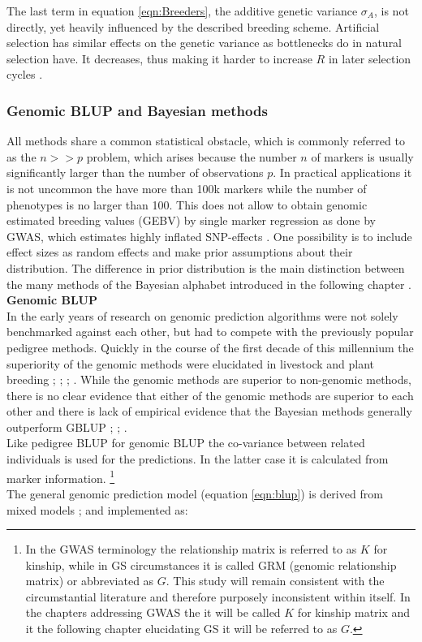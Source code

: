 The last term in equation \ref{eqn:Breeders}, the additive genetic variance $\sigma_A$, is
not directly, yet heavily influenced by the described breeding scheme. Artificial
selection has similar effects on the genetic variance as bottlenecks do in natural selection
have. It decreases, thus making it harder to increase $R$ in later selection cycles
\cite{walsh2018}.

\subsubsection{Genomic BLUP and Bayesian methods}\label{blup:bayes}

All methods share a common statistical obstacle, which is commonly referred to as the
$n >> p$ problem, which arises because the number $n$ of markers is usually significantly
larger than the number of observations $p$. In practical applications it is not uncommon
the have more than 100k markers while the number of phenotypes is no larger than 100. This
does not allow to obtain genomic estimated breeding values (GEBV) by single marker
regression as done by GWAS, which estimates highly inflated SNP-effects
\cite{korte2013advantages}. One possibility is to include effect sizes as random effects
and make prior assumptions about their distribution. The difference in prior distribution
is the main distinction between the many methods of the Bayesian alphabet introduced in
the following chapter \cite{gianola2013}.\\

\noindent
\textbf{Genomic BLUP} \\ In the early years of research on genomic prediction algorithms
were not solely benchmarked against each other, but had to compete with the previously
popular pedigree methods. Quickly in the course of the first decade of this millennium the
superiority of the genomic methods were elucidated in livestock and plant breeding
\cite{habier2007impact}; \cite{vanraden2008efficient}; \cite{vanraden2008reliability}; \cite{harris2009genomic}. While the genomic methods are superior to non-genomic methods,
there is no clear evidence that either of the genomic methods are superior to each other
and there is lack of empirical evidence that the Bayesian methods generally outperform
GBLUP \cite{moser2009comparison}; \cite{bernardo2010breeding}; \cite{azodi2019}. \\
Like pedigree BLUP for genomic BLUP the co-variance between related individuals is used
for the predictions. In the latter case it is calculated from marker information.
\footnote{In the GWAS terminology the relationship matrix is referred to as $K$ for
  kinship, while in GS circumstances it is called GRM (genomic relationship matrix) or
  abbreviated as $G$. This study will remain consistent with the circumstantial literature
  and therefore purposely inconsistent within itself. In the chapters addressing GWAS the
  it will be called $K$ for kinship matrix and it the following chapter elucidating GS
  it will be referred to as $G$.}
\\
The general genomic prediction model (equation \ref{eqn:blup}) is derived from mixed
models \cite{henderson1975best}; \cite{vanraden2008efficient} and implemented as:

